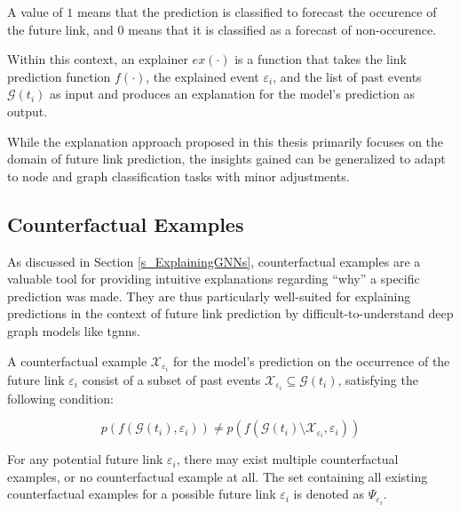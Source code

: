 A value of $1$ means that the prediction is classified to forecast the occurence of the future link, and $0$ means that it is classified as a forecast of non-occurence.


Within this context, an explainer $ex(\cdot)$ is a function that takes the link prediction function $f(\cdot)$, the explained event $\varepsilon_{i}$, and the list of past events $\mathcal{G}(t_i)$ as input and produces an explanation for the model's prediction as output.

While the explanation approach proposed in this thesis primarily focuses on the domain of future link prediction, the insights gained can be generalized to adapt to node and graph classification tasks with minor adjustments.

\subsection{Counterfactual Examples}
\label{s_ProblemFormulation_CFExamples}

As discussed in Section \ref{s_ExplainingGNNs}, counterfactual examples are a valuable tool for providing intuitive explanations regarding “why” a specific prediction was made. They are thus particularly well-suited for explaining predictions in the context of future link prediction by difficult-to-understand deep graph models like \glspl{tgnn}.

A counterfactual example $\mathcal{X}_{\varepsilon_i}$ for the model's prediction on the occurrence of the future link $\varepsilon_{i}$ consist of a subset of past events $\mathcal{X}_{\varepsilon_i} \subseteq \mathcal{G}(t_i)$, satisfying the following condition:

\begin{equation}
    \label{e_CFExplanation}
    p(f(\mathcal{G}(t_i), \varepsilon_{i})) \neq p(f(\mathcal{G}(t_i) \setminus \mathcal{X}_{\varepsilon_i}, \varepsilon_{i}))
\end{equation}


For any potential future link $\varepsilon_{i}$, there may exist multiple counterfactual examples, or no counterfactual example at all. The set containing all existing counterfactual examples for a possible future link $\varepsilon_{i}$ is denoted as $\Psi_{\varepsilon_i}$.


